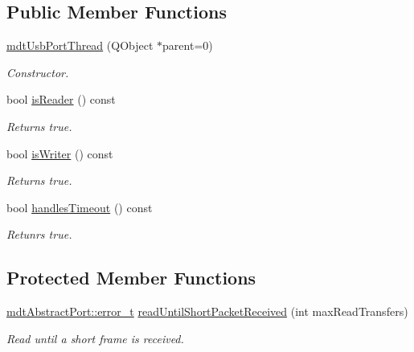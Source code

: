 \subsection*{Public Member Functions}
\begin{DoxyCompactItemize}
\item 
\hypertarget{classmdt_usb_port_thread_aaf4e5883224f05d80132b31a921ac899}{
\hyperlink{classmdt_usb_port_thread_aaf4e5883224f05d80132b31a921ac899}{mdtUsbPortThread} (QObject $\ast$parent=0)}
\label{classmdt_usb_port_thread_aaf4e5883224f05d80132b31a921ac899}

\begin{DoxyCompactList}\small\item\em Constructor. \end{DoxyCompactList}\item 
\hypertarget{classmdt_usb_port_thread_aed82b57c84745f1e2391750697db1022}{
bool \hyperlink{classmdt_usb_port_thread_aed82b57c84745f1e2391750697db1022}{isReader} () const }
\label{classmdt_usb_port_thread_aed82b57c84745f1e2391750697db1022}

\begin{DoxyCompactList}\small\item\em Returns true. \end{DoxyCompactList}\item 
\hypertarget{classmdt_usb_port_thread_a74258f300967b5dea1fbfa9a0ccab38a}{
bool \hyperlink{classmdt_usb_port_thread_a74258f300967b5dea1fbfa9a0ccab38a}{isWriter} () const }
\label{classmdt_usb_port_thread_a74258f300967b5dea1fbfa9a0ccab38a}

\begin{DoxyCompactList}\small\item\em Returns true. \end{DoxyCompactList}\item 
\hypertarget{classmdt_usb_port_thread_aeaa2dabc53e57f6b7cf7077d113c7f40}{
bool \hyperlink{classmdt_usb_port_thread_aeaa2dabc53e57f6b7cf7077d113c7f40}{handlesTimeout} () const }
\label{classmdt_usb_port_thread_aeaa2dabc53e57f6b7cf7077d113c7f40}

\begin{DoxyCompactList}\small\item\em Retunrs true. \end{DoxyCompactList}\end{DoxyCompactItemize}
\subsection*{Protected Member Functions}
\begin{DoxyCompactItemize}
\item 
\hyperlink{classmdt_abstract_port_ad4121bb930c95887e77f8bafa065a85e}{mdtAbstractPort::error\_\-t} \hyperlink{classmdt_usb_port_thread_acca2af9704cc6894ec5b2058ca102af1}{readUntilShortPacketReceived} (int maxReadTransfers)
\begin{DoxyCompactList}\small\item\em Read until a short frame is received. \end{DoxyCompactList}\end{DoxyCompactItemize}


